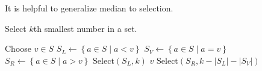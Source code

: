 It is helpful to generalize median to selection.
\begin{algorithm}
	\caption{Select \(k\)th smallest number in a set.}
	\begin{algorithmic}
		\State Choose \(v \in S\)
		\State \(S_L \leftarrow \left\{a \in S \mid a < v \right\}\)
		\State \(S_V \leftarrow \left\{a \in S \mid a = v \right\}\)
		\State \(S_R \leftarrow \left\{a \in S \mid a > v \right\}\)
			\State \Return \(\text{Select}(S_L, k)\)
		\EndIf
			\State \Return \(v\)
		\EndIf
			\State \Return \(\text{Select}(S_R, k - \left|S_L\right| - \left|S_V\right|)\)
		\EndIf
		\EndFunction
	\end{algorithmic}
\end{algorithm}